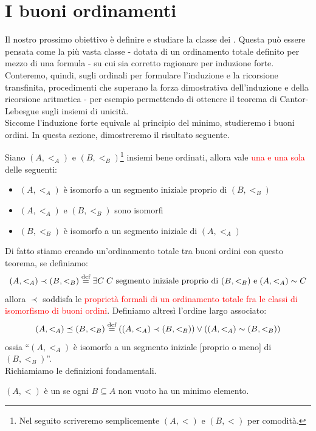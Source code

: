 \section{I buoni ordinamenti}
Il nostro prossimo obiettivo è definire e studiare la classe dei . Questa può essere pensata come la più vasta classe
- dotata di un ordinamento totale definito per mezzo di una formula - su cui sia corretto ragionare per induzione forte. Conteremo, quindi, sugli ordinali per formulare 
l'induzione e la ricorsione transfinita, procedimenti che superano la forza dimostrativa dell'induzione e della ricorsione aritmetica - per esempio permettendo di ottenere 
il teorema di Cantor-Lebesgue sugli insiemi di unicità.\\
Siccome l'induzione forte equivale al principio del minimo, studieremo i buoni ordini. In questa sezione, dimostreremo il risultato seguente.

\begin{theorem}
	Siano $(A,<_A)$ e $(B,<_B)$\footnote{Nel seguito scriveremo semplicemente $(A,<)$ e $(B,<)$ per comodità.} insiemi bene ordinati, allora vale \textcolor{red}{una e una sola} delle seguenti:
	\begin{itemize}
		\item $(A,<_A)$ è isomorfo a un segmento iniziale proprio di $(B,<_B)$
		\item $(A,<_A)$ e $(B,<_B)$ sono isomorfi
		\item $(B,<_B)$ è isomorfo a un segmento iniziale di $(A,<_A)$
	\end{itemize}
\end{theorem}

Di fatto stiamo creando un'ordinamento totale tra buoni ordini con questo teorema, se definiamo:
\[ (A,<_A) \prec (B,<_B) \overset{\text{def}}{=} \exists C \; \text{$C$ segmento iniziale proprio di $(B,<_B)$ e} \; (A,<_A) \sim C
	\]
allora $\prec$ soddisfa le \textcolor{red}{proprietà formali di un ordinamento totale fra le classi di isomorfismo di buoni ordini}.
Definiamo altresì l'ordine largo associato:
\[ (A,<_A) \preceq (B,<_B) \overset{\text{def}}{=} ((A,<_A) \prec (B,<_B)) \lor ((A,<_A) \sim (B,<_B))
	\]
ossia ``$(A,<_A)$ è isomorfo a un segmento iniziale [proprio o meno] di $(B,<_B)$''.\\
Richiamiamo le definizioni fondamentali.

\begin{definition}
	$(A,<)$ è un  se ogni $B \subseteq A$ non vuoto ha un minimo elemento.
\end{definition}

